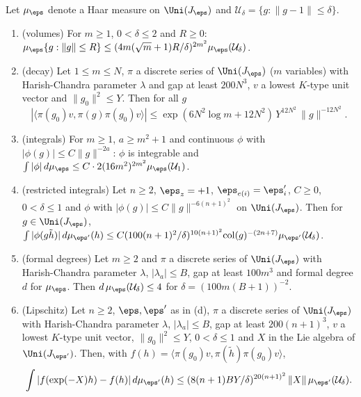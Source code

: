 \begin{theorem}\label{pf:fs:analytic}
Let $\mu_\eps$ denote a Haar measure on $\Uni(J_\eps)$ and $\mathcal U_\delta=\{g:\|g-1\|\le\delta\}$.
\begin{enumerate}[label=(\alph*)]
\item (volumes) For $m\ge1$, $0<\delta\le2$ and $R\ge0$: $\mu_\eps\{g:\|g\|\le R\}\le(4m(\sqrt m+1)R/\delta)^{2m^2}\mu_\eps(\mathcal U_\delta)$.
\item (decay) Let $1\le m\le N$, $\pi$ a discrete series of $\Uni(J_\eps)$ ($m$ variables) with Harish-Chandra parameter $\lambda$ and gap at least
$200N^3$, $v$ a lowest $K$-type unit vector and $\|g_0\|^2\le Y$. Then for all $g$
\[
|\langle\pi(g_0)v,\pi(g)\pi(g_0)v\rangle|\le\exp(6N^2\log m+12N^2)\,Y^{12N^2}\,\|g\|^{-12N^2}.
\]
\item (integrals) For $m\ge1$, $a\ge m^2+1$ and continuous $\phi$ with $|\phi(g)|\le C\|g\|^{-2a}$: $\phi$ is integrable and
$\int|\phi|\,d\mu_\eps\le C\cdot2(16m^2)^{2m^2}\mu_\eps(\mathcal U_1)$.
\item (restricted integrals) Let $n\ge2$, $\eps_z=+1$, $\eps_{e(i)}=\eps'_i$, $C\ge0$, $0<\delta\le1$ and $\phi$ with $|\phi(g)|\le C\|g\|^{-6(n+1)^2}$ on
$\Uni(J_\eps)$. Then for $g\in\Uni(J_\eps)$,
$\int|\phi(g\tilde h)|\,d\mu_{\eps'}(h)\le C(100(n+1)^2/\delta)^{10(n+1)^2}\mathrm{col}(g)^{-(2n+7)}\mu_{\eps'}(\mathcal U_\delta)$.
\item (formal degrees) Let $m\ge2$ and $\pi$ a discrete series of $\Uni(J_\eps)$ with Harish-Chandra parameter $\lambda$, $|\lambda_a|\le B$, gap at least
$100m^3$ and formal degree $d$ for $\mu_\eps$. Then $d\,\mu_\eps(\mathcal U_\delta)\le4$ for $\delta=(100m(B+1))^{-2}$.
\item (Lipschitz) Let $n\ge2$, $\eps,\eps'$ as in (d), $\pi$ a discrete series of $\Uni(J_\eps)$ with Harish-Chandra parameter $\lambda$, $|\lambda_a|\le B$,
gap at least $200(n+1)^3$, $v$ a lowest $K$-type unit vector, $\|g_0\|^2\le Y$, $0<\delta\le1$ and $X$ in the Lie algebra of $\Uni(J_{\eps'})$.
Then, with $f(h)=\langle\pi(g_0)v,\pi(\tilde h)\pi(g_0)v\rangle$,
\[
\int|f(\exp(-X)h)-f(h)|\,d\mu_{\eps'}(h)\le(8(n+1)BY/\delta)^{20(n+1)^2}\,\|X\|\,\mu_{\eps'}(\mathcal U_\delta).
\]
\end{enumerate}
\end{theorem}

